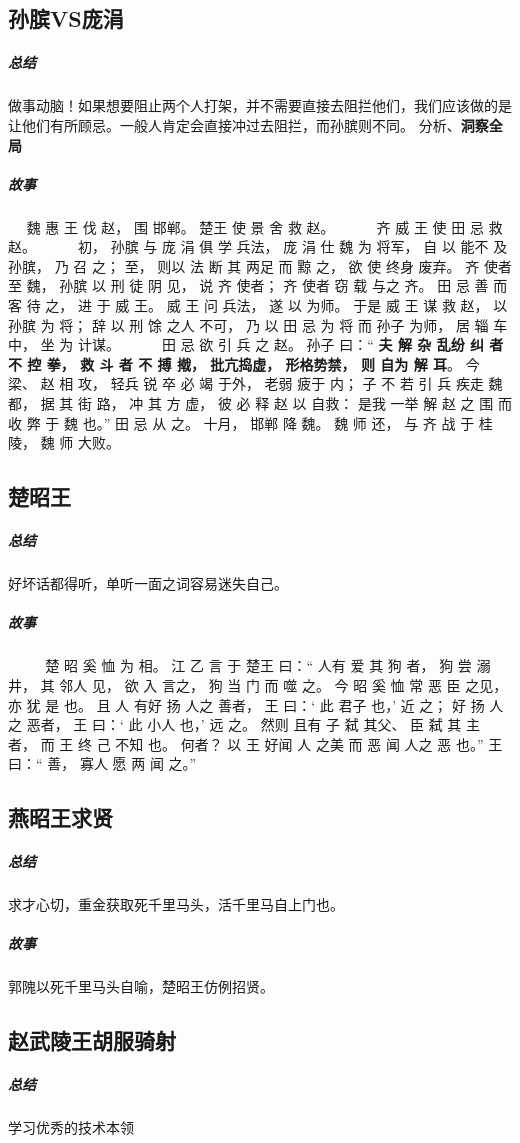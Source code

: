 \documentclass[UTF8,a4paper,8pt]{ctexbook}
\begin{document}
		\subsection{孙膑VS庞涓}
			\subparagraph{总结}做事动脑！如果想要阻止两个人打架，并不需要直接去阻拦他们，我们应该做的是让他们有所顾忌。一般人肯定会直接冲过去阻拦，而孙膑则不同。  分析、\textbf{洞察全局}
			
			\subparagraph{故事}
				　 魏 惠 王 伐 赵， 围 邯郸。 楚王 使 景 舍 救 赵。 
				　 
				　 齐 威 王 使 田 忌 救 赵。 
				　 
				　 初， 孙膑 与 庞 涓 俱 学 兵法， 庞 涓 仕 魏 为 将军， 自 以 能不 及 孙膑， 乃 召 之； 至， 则以 法 断 其 两足 而 黥 之， 欲 使 终身 废弃。 齐 使者 至 魏， 孙膑 以 刑 徒 阴 见， 说 齐 使者； 齐 使者 窃 载 与之 齐。 田 忌 善 而 客 待 之， 进 于 威 王。 威 王 问 兵法， 遂 以 为师。 于是 威 王 谋 救 赵， 以 孙膑 为 将； 辞 以 刑 馀 之人 不可， 乃 以 田 忌 为 将 而 孙子 为师， 居 辎 车 中， 坐 为 计谋。 
				　 
				　 田 忌 欲 引 兵 之 赵。 孙子 曰：“ \textbf{夫 解 杂 乱纷 纠 者 不 控 拳， 救 斗 者 不 搏 撠， 批亢捣虚， 形格势禁， 则 自为 解 耳}。 今 梁、 赵 相 攻， 轻兵 锐 卒 必 竭 于外， 老弱 疲于 内； 子 不 若 引 兵 疾走 魏 都， 据 其 街 路， 冲 其 方 虚， 彼 必 释 赵 以 自救： 是我 一举 解 赵 之 围 而 收 弊 于 魏 也。” 田 忌 从 之。 十月， 邯郸 降 魏。 魏 师 还， 与 齐 战 于 桂 陵， 魏 师 大败。
				　 
		\subsection{楚昭王}
			\subparagraph{总结}好坏话都得听，单听一面之词容易迷失自己。
			
			\subparagraph{故事}		　 
				　 楚 昭 奚 恤 为 相。 江 乙 言 于 楚王 曰：“ 人有 爱 其 狗 者， 狗 尝 溺 井， 其 邻人 见， 欲 入 言之， 狗 当 门 而 噬 之。 今 昭 奚 恤 常 恶 臣 之见， 亦 犹 是 也。 且 人 有好 扬 人之 善者， 王 曰：‘ 此 君子 也，’ 近 之； 好 扬 人之 恶者， 王 曰：‘ 此 小人 也，’ 远 之。 然则 且有 子 弑 其父、 臣 弑 其 主 者， 而 王 终 己 不知 也。 何者？ 以 王 好闻 人 之美 而 恶 闻 人之 恶 也。” 王 曰：“ 善， 寡人 愿 两 闻 之。”
				　 
		\subsection{燕昭王求贤}
			\subparagraph{总结} 求才心切，重金获取死千里马头，活千里马自上门也。
			
			\subparagraph{故事} 郭隗以死千里马头自喻，楚昭王仿例招贤。
		
		\subsection{赵武陵王胡服骑射}
			\subparagraph{总结}学习优秀的技术本领
			
\end{document}
